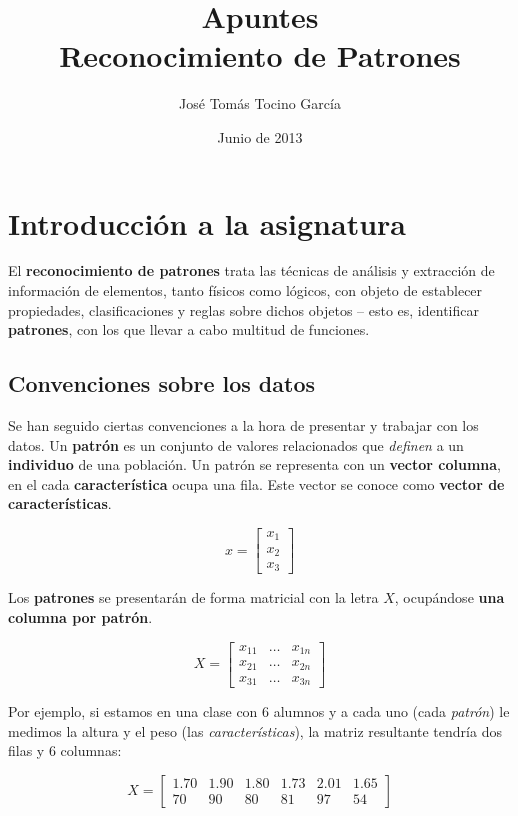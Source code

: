 \documentclass[11pt]{scrartcl}
\title{\Huge{Apuntes}\\[0.2cm]\LARGE{Reconocimiento de Patrones}}
\author{José Tomás Tocino García}
\date{Junio de 2013}
\begin{document}
\maketitle

\tableofcontents

\pagebreak

\section{Introducción a la asignatura}

El \textbf{reconocimiento de patrones} trata las técnicas de análisis y
extracción de información de elementos, tanto físicos como lógicos, con objeto
de establecer propiedades, clasificaciones y reglas sobre dichos objetos -- esto
es, identificar \textbf{patrones}, con los que llevar a cabo multitud de
funciones.

\subsection{Convenciones sobre los datos}

Se han seguido ciertas convenciones a la hora de presentar y trabajar con los
datos. Un \textbf{patrón} es un conjunto de valores relacionados que
\textit{definen} a un \textbf{individuo} de una población. Un patrón se
representa con un \textbf{vector columna}, en el cada \textbf{característica}
ocupa una fila. Este vector se conoce como \textbf{vector de características}.

$$
x = \begin{bmatrix}
x_1 \\
x_2 \\
x_3 
\end{bmatrix}
$$


Los \textbf{patrones} se presentarán de forma matricial con la letra $X$,
ocupándose \textbf{una columna por patrón}. 

$$
X = \begin{bmatrix}
x_{11} & \ldots & x_{1n} \\
x_{21} & \ldots & x_{2n} \\
x_{31} & \ldots & x_{3n}
\end{bmatrix}
$$

Por ejemplo, si estamos en una clase con 6 alumnos y a cada uno (cada
\textit{patrón}) le medimos la altura y el peso (las \textit{características}),
la matriz resultante tendría dos filas y 6 columnas:

$$
X = \begin{bmatrix}
1.70 & 1.90 & 1.80 & 1.73 & 2.01 & 1.65 \\
70   & 90   & 80   & 81   & 97   & 54
\end{bmatrix}
$$
\end{document}
